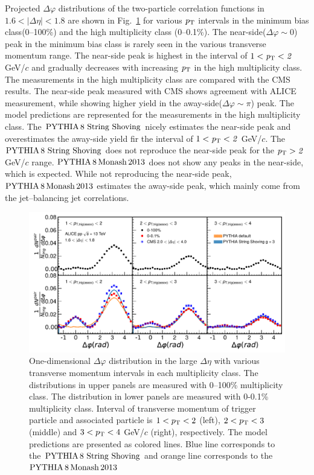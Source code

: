  Projected $\Delta\varphi$ distributions of the two-particle correlation functions in $1.6<|\Delta\eta|<1.8$ are shown in Fig.~\ref{fig:PlotDeltaPhi} for various $\it{p}_{\rm{T}}$ intervals in the minimum bias class(0--100\%) and the high multiplicity class (0--0.1\%). The near-side($\Delta\varphi\sim 0$) peak in the minimum bias class is rarely seen in the various transverse momentum range. The near-side peak is highest in the interval of $1<\it{p}_{\rm{T}}<2$ GeV/$c$ and gradually decreases with increasing $\it{p}_{\rm{T}}$ in the high multiplicity class. The measurements in the high multiplicity class are compared with the CMS results. The near-side peak measured with CMS shows agreement with ALICE measurement, while showing higher yield in the away-side($\Delta\varphi\sim\pi$) peak. The model predictions are represented for the measurements in the high multiplicity class. The $\mathrm{PYTHIA}\,8~\mathrm{String}~\mathrm{Shoving}$ nicely estimates the near-side peak and overestimates the away-side yield fir the interval of $1<\it{p}_{\rm{T}}<2$ GeV/$c$. The $\mathrm{PYTHIA}\,8~\mathrm{String}~\mathrm{Shoving}$ does not reproduce the near-side peak for the $\it{p}_{\rm{T}}>2$ GeV/$c$ range. $\mathrm{PYTHIA}\,8\,\mathrm{Monash}\,2013$ does not show any peaks in the near-side, which is expected. While not reproducing the near-side peak, $\mathrm{PYTHIA}\,8\,\mathrm{Monash}\,2013$ estimates the away-side peak, which mainly come from the jet--balancing jet correlations.



\begin{figure}[h!]
	\centering
	\includegraphics[width=0.99\linewidth]{./figures/Fig2_PlotDeltaPhi.pdf}
	\caption{One-dimensional $\Delta\varphi$ distribution in the large $\Delta\eta$ with various transverse momentum intervals in each multiplicity class. The distributions in upper panels are measured with 0--100\% multiplicity class. The distribution in lower panels are measured with 0-0.1\% multiplicity class. Interval of transverse momentum of trigger particle and associated particle is $1<p_\mathrm{T}<2$ (left), $2<p_\mathrm{T}<3$ (middle) and $3<p_\mathrm{T}<4$ GeV/$c$ (right), respectively. The model predictions are presented as colored lines. Blue line corresponds to the $\mathrm{PYTHIA}\,8~\mathrm{String}~\mathrm{Shoving}$ and orange line corresponds to the $\mathrm{PYTHIA}\,8\,\mathrm{Monash}\,2013$}
	\label{fig:PlotDeltaPhi}
\end{figure}
 
